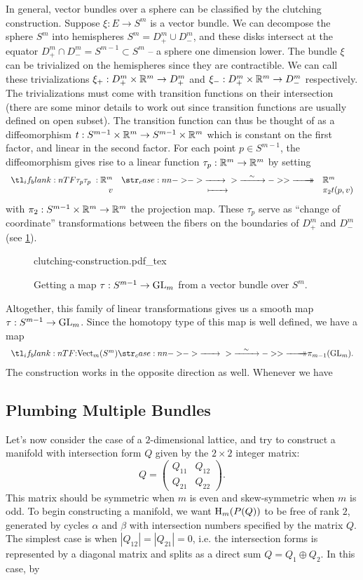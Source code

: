 In general, vector bundles over a sphere can be classified by the clutching construction. Suppose $\xi : E \to S^m$ is a vector bundle. We can decompose the sphere $S^m$ into hemispheres $S^m=D_+^m\cup D_-^m$, and these disks intersect at the equator $D_+^m\cap D_-^m=S^{m-1}\subset S^m$ -- a sphere one dimension lower. The bundle $\xi$ can be trivialized on the hemispheres since they are contractible. We can call these trivializations $\xi_+ : D_+^m\times \mathbb{R}^m \to D_+^m$ and $\xi_- : D_+^m \times \mathbb{R}^m \to D_-^m$ respectively. The trivializations must come with transition functions on their intersection (there are some minor details to work out since transition functions are usually defined on open subset). The transition function can thus be thought of as a diffeomorphism $t : S^{m-1}\times \mathbb{R}^m \to S^{m-1}\times \mathbb{R}^m$ which is constant on the first factor, and linear in the second factor. For each point $p\in S^{m-1}$, the diffeomorphism gives rise to a linear function $\tau_p : \mathbb{R}^m \to \mathbb{R}^m$ by setting 
\[
	\lkxfunc{\tau_p}{\R^m}{\R^m}{v}{\pi_2 t(p,v)}
\]
with $\pi_2 : S^{m-1}\times \mathbb{R}^m \to \mathbb{R}^m$ the projection map. These $\tau_p$ serve as ``change of coordinate'' transformations between the fibers on the boundaries of $D_+^m$ and $D_-^m$ (see \cref{fig:clutching-construction}).
\begin{figure}[ht]
	\centering
{clutching-construction.pdf_tex}
\caption{Getting a map $\tau : S^{m-1}\to {\operatorname{GL}}_m$ from a vector bundle over $S^{m}$.}\label{fig:clutching-construction}
\end{figure}

Altogether, this family of linear transformations gives us a smooth map $\tau : S^{m-1}\to {\operatorname{GL}}_m$. 
Since the homotopy type of this map is well defined, we have a map
\[
	\lkxfunc{}{\op{Vect}_m(S^m)}{\pi_{m-1}(\GL_m).}
\]
The construction works in the opposite direction as well. Whenever we have 

%

\subsection*{Plumbing Multiple Bundles}

Let's now consider the case of a $2$-dimensional lattice, and try to construct a manifold with intersection form $Q$ given by the $2\times 2$ integer matrix:
\[
	Q = \begin{pmatrix} Q_{11} & Q_{12} \\ Q_{21} & Q_{22}\end{pmatrix}.
\]
This matrix should be symmetric when $m$ is even and skew-symmetric when $m$ is odd. To begin constructing a manifold, we want $\operatorname{H}_m(P(Q))$ to be free of rank $2$, generated by cycles $\alpha$ and $\beta$ with intersection numbers specified by the matrix $Q$. The simplest case is when $|Q_{12}|=|Q_{21}|=0$, i.e. the intersection forms is represented by a diagonal matrix and splits as a direct sum $Q=Q_1\oplus Q_2$. In this case, by 

